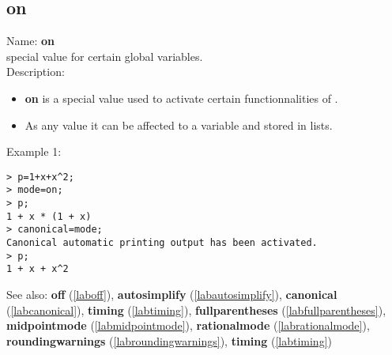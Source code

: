 \subsection{on}
\label{labon}
\noindent Name: \textbf{on}\\
special value for certain global variables.\\
\noindent Description: \begin{itemize}

\item \textbf{on} is a special value used to activate certain functionnalities 
   of \sollya.

\item As any value it can be affected to a variable and stored in lists.
\end{itemize}
\noindent Example 1: 
\begin{center}\begin{minipage}{15cm}\begin{Verbatim}[frame=single]
> p=1+x+x^2;
> mode=on;
> p;
1 + x * (1 + x)
> canonical=mode;
Canonical automatic printing output has been activated.
> p;
1 + x + x^2
\end{Verbatim}
\end{minipage}\end{center}
See also: \textbf{off} (\ref{laboff}), \textbf{autosimplify} (\ref{labautosimplify}), \textbf{canonical} (\ref{labcanonical}), \textbf{timing} (\ref{labtiming}), \textbf{fullparentheses} (\ref{labfullparentheses}), \textbf{midpointmode} (\ref{labmidpointmode}), \textbf{rationalmode} (\ref{labrationalmode}), \textbf{roundingwarnings} (\ref{labroundingwarnings}), \textbf{timing} (\ref{labtiming})
